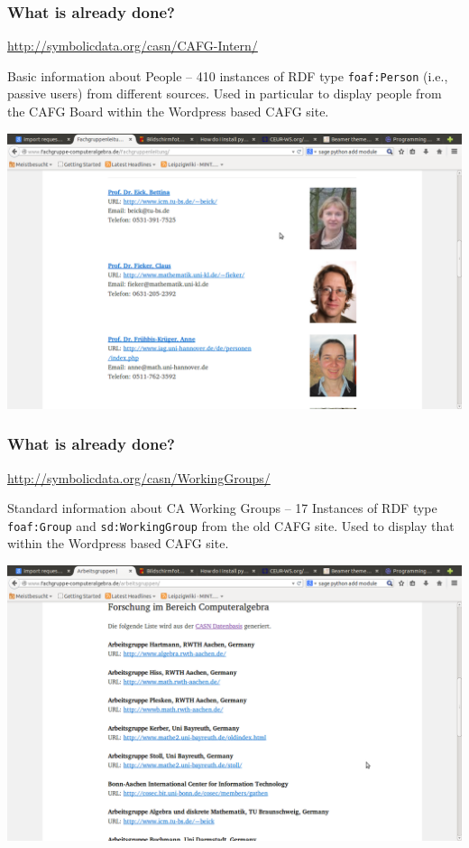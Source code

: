 \documentclass{beamer}
\begin{document}
\begin{frame}\frametitle{What is already done? }\small

  \begin{center}
    \url{http://symbolicdata.org/casn/CAFG-Intern/}
  \end{center}

Basic information about People -- 410 instances of RDF type
\texttt{foaf:Person} (i.e., passive users) from different sources.  Used in
particular to display people from the CAFG Board within the Wordpress based
CAFG site.

\begin{center}
  \includegraphics[width=.8\textwidth]{cicm-14/People.png}
\end{center}
\end{frame}

\begin{frame}\frametitle{What is already done?}\small

  \begin{center}
    \url{http://symbolicdata.org/casn/WorkingGroups/}
  \end{center}

Standard information about CA Working Groups -- 17 Instances of RDF type
\texttt{foaf:Group} and \texttt{sd:WorkingGroup} from the old CAFG site.  Used
to display that within the Wordpress based CAFG site.

\begin{center}
  \includegraphics[width=.8\textwidth]{cicm-14/WorkingGroups.png}
\end{center}
\end{frame}
\end{document}
